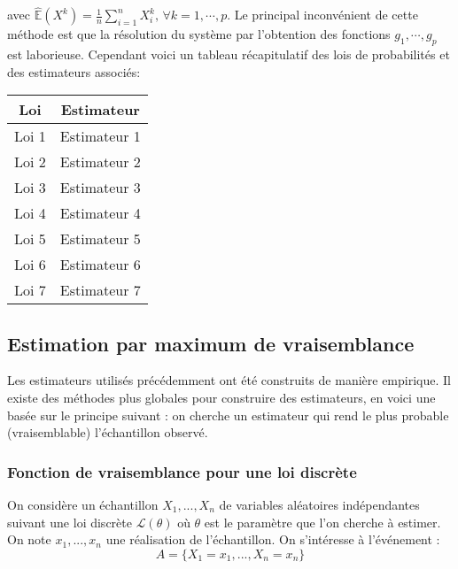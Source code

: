 avec $\widehat{\mathbb{E}}(X^{k})=\displaystyle \frac{1}{n}\sum_{i=1}^{n}X_{i}^{k},\,\forall k=1,\cdots,p$.
Le principal inconvénient de cette méthode est que la résolution du système par l'obtention des fonctions $g_1,\cdots{},g_p$ est laborieuse. Cependant voici un tableau récapitulatif des lois de probabilités et des estimateurs associés:\\


\begin{tabular}{|c|c|}
  \hline
  Loi & Estimateur \\
  \hline
  Loi 1 & Estimateur 1 \\
  \hline
  Loi 2 & Estimateur 2 \\
  \hline
  Loi 3 & Estimateur 3 \\
  \hline
  Loi 4 & Estimateur 4 \\
  \hline
  Loi 5 & Estimateur 5 \\
  \hline
  Loi 6 & Estimateur 6 \\
  \hline
  Loi 7 & Estimateur 7 \\
  \hline
\end{tabular}


\subsection{Estimation par maximum de vraisemblance}
Les estimateurs utilisés précédemment ont été construits de manière empirique. Il existe des méthodes plus globales pour construire des estimateurs, en voici une basée sur le principe suivant : on cherche un estimateur qui rend le plus probable (vraisemblable) l'échantillon observé.


\subsubsection{Fonction de vraisemblance pour une loi discrète}

On considère un échantillon $X_1,...,X_n$ de variables aléatoires indépendantes suivant une loi discrète $\mathcal{L}(\theta)$ où $\theta$ est le paramètre que l'on cherche à estimer. On note $x_1,...,x_n$ une réalisation de l'échantillon. On s'intéresse à l'événement : 
$$A = \{X_1=x_1,...,X_n=x_n\}$$

